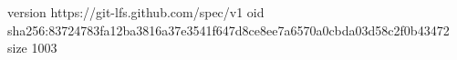 version https://git-lfs.github.com/spec/v1
oid sha256:83724783fa12ba3816a37e3541f647d8ce8ee7a6570a0cbda03d58c2f0b43472
size 1003
